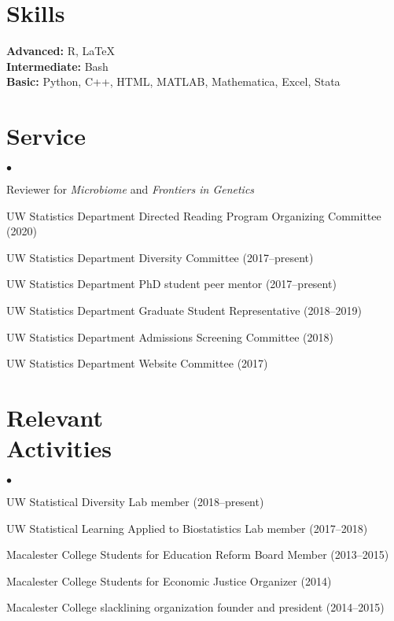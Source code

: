 \documentclass[margin,centered]{res}
\newenvironment{list1}{
  \begin{list}{\ding{113}}{%
      \setlength{\itemsep}{0in}
      \setlength{\parsep}{0in} \setlength{\parskip}{0in}
      \setlength{\topsep}{0in} \setlength{\partopsep}{0in}
      \setlength{\leftmargin}{0.17in}}}{\end{list}}
\newenvironment{list2}{
  \begin{list}{$\bullet$}{%
      \setlength{\itemsep}{0in}
      \setlength{\parsep}{0in} \setlength{\parskip}{0in}
      \setlength{\topsep}{0in} \setlength{\partopsep}{0in}
      \setlength{\leftmargin}{0.2in}}}{\end{list}}
\begin{document}
\begin{resume}
\section{\sc Skills}
{\bf Advanced:} R, LaTeX\\
{\bf Intermediate:} Bash\\
{\bf Basic:} Python, C++, HTML, MATLAB, Mathematica, Excel, Stata


\section{\sc Service}

\begin{list1}
\item[]
\begin{list2}
\vspace*{.05in}
\item Reviewer for \textit{Microbiome} and \textit{Frontiers in Genetics}
\item UW Statistics Department Directed Reading Program Organizing Committee (2020)
\item UW Statistics Department Diversity Committee (2017--present)
\item UW Statistics Department PhD student peer mentor (2017--present)
\item UW Statistics Department Graduate Student Representative (2018--2019)
\item UW Statistics Department Admissions Screening Committee (2018)
\item UW Statistics Department Website Committee (2017)
\end{list2}
\end{list1}

\section{\sc Relevant \\ Activities}


\begin{list1}
\item[]
\begin{list2}
\vspace*{.05in}
\item UW Statistical Diversity Lab member (2018--present)
\item UW Statistical Learning Applied to Biostatistics Lab member (2017--2018)
\item Macalester College Students for Education Reform Board Member (2013--2015)
\item Macalester College Students for Economic Justice Organizer (2014)
\item Macalester College slacklining organization founder and president (2014--2015)
\end{list2}
\end{list1}



%
\thispagestyle{lastpage}
\end{resume}
\end{document}
